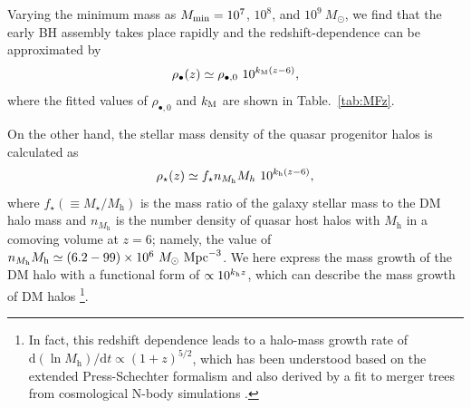 \documentclass[twocolumn, twocolappendix]{aastex63}
\newcommand{\Msun}{M_\odot}
\newcommand{\Msunyr}{M_\odot~{\rm yr}^{-1}}
\newcommand{\Mh}{M_\mathrm{h}}
\newcommand{\D}{\mathrm{d}}
\begin{document}
\begin{CJK*}{UTF8}{gbsn}
Varying the minimum mass as $M_{\rm min}=10^7$, $10^8$, and $10^9~\Msun$,
we find that the early BH assembly takes place rapidly and the redshift-dependence can be approximated by
%
\begin{equation}
\rho_\bullet(z)
\simeq \rho_{\bullet,0}~ 10^{k_{\rm M}(z-6)},
\end{equation}
%
where the fitted values of $\rho_{\bullet,0}$ and $k_{\rm M}$ are shown in Table.~\ref{tab:MFz}.

On the other hand, the stellar mass density of the quasar progenitor halos is calculated as
%
\begin{equation}
\rho_{\star}(z)
\simeq f_\star n_{\Mh} M_h~ 10^{k_{\rm h}(z-6)},
\end{equation}
%
where $f_\star(\equiv M_\star/\Mh)$ is the mass ratio of the galaxy stellar mass to the DM halo mass and
$n_{\Mh}$ is the number density of quasar host halos with $\Mh$ in a comoving volume at $z=6$; namely,
the value of $n_{\Mh}\Mh \simeq (6.2-99)\times 10^6~\Msun~{\rm Mpc}^{-3}$.
We here express the mass growth of the DM halo with a functional form of $\propto 10^{k_{\rm h} z}$,
which can describe the mass growth of DM halos
\citep[e.g.,][]{2002ApJ...568...52W,2008MNRAS.383..615N,2008MNRAS.388.1792N,2010MNRAS.406.2267F}
\footnote[4]{
In fact, this redshift dependence leads to a halo-mass growth rate of $\D \left(\ln \Mh \right) / \D t \propto(1+z)^{5/2}$,
which has been understood based on the extended Press-Schechter formalism and also derived by
a fit to merger trees from cosmological N-body simulations \citep{2013MNRAS.435..999D}.}.



\end{CJK*}
\end{document}
